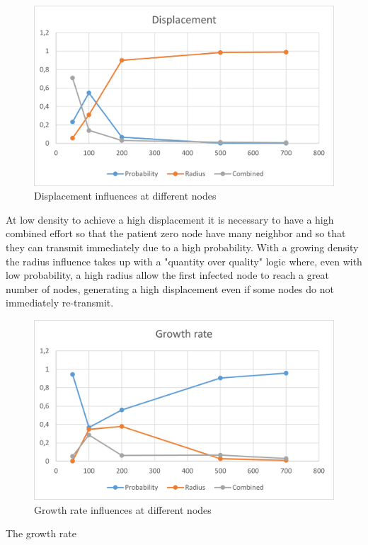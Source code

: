 \begin{figure}[H]\label{pic:DisplacementNodes}
\centering
    \includegraphics[width= 1\textwidth]{./images/DisplacementWithNodes.png}
    \caption{Displacement influences at different nodes}
\end{figure}

At low density to achieve a high displacement it is necessary to have a high combined effort so that the patient zero node have many neighbor and so that they can transmit immediately due to a high probability. With a growing density the radius influence takes up with a "quantity over quality" logic where, even with low probability, a high radius allow the first infected node to reach a great number of nodes, generating a high displacement even if some nodes do not immediately re-transmit.

\begin{figure}[H]\label{pic:GrowthRatesNodes}
\centering
    \includegraphics[width= 1\textwidth]{./images/GrowthRateWithNodes.png}
    \caption{Growth rate influences at different nodes}
\end{figure}

The growth rate 